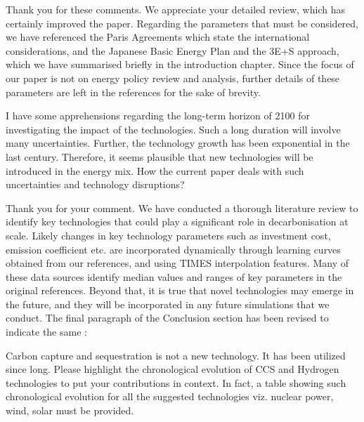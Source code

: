 \documentclass[answers,11pt]{exam}
\begin{document}
\begin{questions}
        \begin{solution}
                Thank you for these comments. We appreciate your detailed review, which has certainly improved the paper. Regarding the parameters that must be considered, we have referenced the Paris Agreements which state the international considerations, and the Japanese Basic Energy Plan and the 3E+S approach, which we have summarised briefly in the introduction chapter. Since the focus of our paper is not on energy policy review and analysis, further details of these parameters are left in the references for the sake of brevity.
        \end{solution}


        \question I have some apprehensions regarding the long-term horizon of 2100 for investigating the impact of the technologies. Such a long duration will involve many uncertainties. Further, the technology growth has been exponential in the last century. Therefore, it seems plausible that new technologies will be introduced in the energy mix. How the current paper deals with such uncertainties and technology disruptions?
        
        \begin{solution}
                 Thank you for your comment. We have conducted a thorough literature review to identify key technologies that could play a significant role in decarbonisation at scale. Likely changes in key technology parameters such as investment cost, emission coefficient etc. are incorporated dynamically through learning curves obtained from our references, and using TIMES interpolation features. Many of these data sources identify median values and ranges of key parameters in the original references. Beyond that, it is true that novel technologies may emerge in the future, and they will be incorporated in any future simulations that we conduct. The final paragraph of the Conclusion section has been revised to indicate the same :
                 
                 
        \end{solution}
        
                \question Carbon capture and sequestration is not a new technology. It has been utilized since long. Please highlight the chronological evolution of CCS and Hydrogen technologies to put your contributions in context. In fact, a table showing such chronological evolution for all the suggested technologies viz. nuclear power, wind, solar must be provided. 
        

\end{questions}
\end{document}
